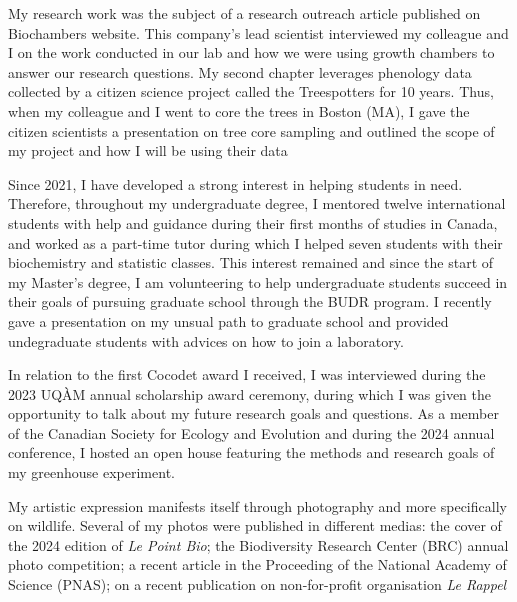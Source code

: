 \documentclass[12pt]{article}
\begin{document}
My research work was the subject of a research outreach article published on Biochambers website. This company's lead scientist interviewed my colleague and I on the work conducted in our lab and how we were using growth chambers to answer our research questions. My second chapter leverages phenology data collected by a citizen science project called the Treespotters for 10 years. Thus, when my colleague and I went to core the trees in Boston (MA), I gave the citizen scientists a presentation on tree core sampling and outlined the scope of my project and how I will be using their data

Since 2021, I have developed a strong interest in helping students in need. Therefore, throughout my undergraduate degree, I mentored twelve international students with help and guidance during their first months of studies in Canada, and worked as a part-time tutor during which I helped seven students with their biochemistry and statistic classes. This interest remained and since the start of my Master's degree, I am volunteering to help undergraduate students succeed in their goals of pursuing graduate school through the BUDR program. I recently gave a presentation on my unsual path to graduate school and provided undegraduate students with advices on how to join a laboratory.

In relation to the first Cocodet award I received, I was interviewed during the 2023 UQÀM annual scholarship award ceremony, during which I was given the opportunity to talk about my future research goals and questions. As a member of the Canadian Society for Ecology and Evolution and during the 2024 annual conference, I hosted an open house featuring the methods and research goals of my greenhouse experiment. 

My artistic expression manifests itself through photography and more specifically on wildlife. Several of my photos were published in different medias: the cover of the 2024 edition of \textit{Le Point Bio}; the Biodiversity Research Center (BRC) annual photo competition; a recent article in the Proceeding of the National Academy of Science (PNAS); on a recent publication on non-for-profit organisation \textit{Le Rappel}



%
\end{document}
